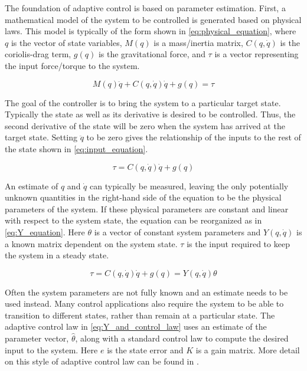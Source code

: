 \documentclass[letterpaper, 10 pt, conference]{ieeeconf}  %
\begin{document}
The foundation of adaptive control is based on parameter estimation.
First, a mathematical model of the system to be controlled is generated based on physical laws.
This model is typically of the form shown in \eqref{eq:physical_equation}, where $q$ is the vector of state variables, $M(q)$ is a mass/inertia matrix, $C(q,\dot{q})$ is the coriolis-drag term, $g(q)$ is the gravitational force, and $\tau$ is a vector representing the input force/torque to the system.

\begin{equation} \label{eq:physical_equation}
M(q)\ddot{q} + C(q,\dot{q})\dot{q} + g(q) = \tau
\end{equation}

The goal of the controller is to bring the system to a particular target state.
Typically the state as well as its derivative is desired to be controlled.
Thus, the second derivative of the state will be zero when the system has arrived at the target state.
Setting $\ddot{q}$ to be zero gives the relationship of the inputs to the rest of the state shown in \eqref{eq:input_equation}.

\begin{equation} \label{eq:input_equation}
\tau = C(q,\dot{q})\dot{q} + g(q)
\end{equation}

An estimate of $q$ and $\dot{q}$ can typically be measured, leaving the only potentially unknown quantities in the right-hand side of the equation to be the physical parameters of the system.
If these physical parameters are constant and linear with respect to the system state, the equation can be reorganized as in \eqref{eq:Y_equation}.
Here $\theta$ is a vector of constant system parameters and $Y(q,\dot{q})$ is a known matrix dependent on the system state. 
$\tau$ is the input required to keep the system in a steady state.

\begin{equation} \label{eq:Y_equation}
\tau = C(q,\dot{q})\dot{q} + g(q) = Y(q,\dot{q})\theta
\end{equation}

Often the system parameters are not fully known and an estimate needs to be used instead.
Many control applications also require the system to be able to transition to different states, rather than remain at a particular state.
The adaptive control law in \eqref{eq:Y_and_control_law} uses an estimate of the parameter vector, $\hat{\theta}$, along with a standard control law to compute the desired input to the system. Here $e$ is the state error and $K$ is a gain matrix.
More detail on this style of adaptive control law can be found in \cite{slotine1987adaptive, slotine1991applied, cheah2006adaptive}.
\end{document}
